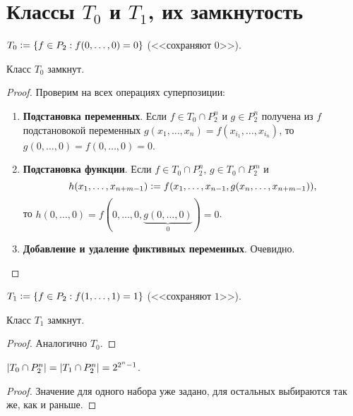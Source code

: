 \section{Классы $T_0$ и $T_1$, их замкнутость}

\begin{definition}
    $T_0 \vcentcolon = \{f \in P_2: f(0, \ldots, 0) = 0\}$ (<<сохраняют $0$>>).
\end{definition}

\begin{proposal}
    Класс $T_0$ замкнут.
\end{proposal}

\begin{proof}
    Проверим на всех операциях суперпозиции:
    \begin{enumerate}
        \item \textbf{Подстановка переменных}. Если $f \in T_0 \cap P_2^n$ и $g \in P_2^n$ получена из $f$ подстановокой переменных $g(x_1, \ldots, x_n) = f(x_{i_1}, \ldots, x_{i_n})$, то $g(0, \ldots, 0) = f(0, \ldots, 0) = 0$.
        \item \textbf{Подстановка функции}. Если $f \in T_0 \cap P_2^n$, $g \in T_0 \cap P_2^m$ и
            \[
                h(x_1, \ldots, x_{n + m - 1}) \vcentcolon = f(x_1, \ldots, x_{n - 1}, g(x_n, \ldots, x_{n + m - 1})),
            \]
            то $h(0, \ldots, 0) = f(0, \ldots, 0, \underbrace{g(0, \ldots, 0)}_{0}) = 0$.
        \item \textbf{Добавление и удаление фиктивных переменных}. Очевидно.
    \end{enumerate}
\end{proof}

\begin{definition}
    $T_1 \vcentcolon = \{f \in P_2: f(1, \ldots, 1) = 1\}$ (<<сохраняют $1$>>).
\end{definition}

\begin{proposal}
    Класс $T_1$ замкнут.
\end{proposal}

\begin{proof}
    Аналогично $T_0$.
\end{proof}

\begin{proposal}
    $\left\lvert T_0 \cap P_2^n\right\rvert = \left\lvert T_1 \cap P_2^n\right\rvert = 2^{2^n - 1}$.
\end{proposal}

\begin{proof}
    Значение для одного набора уже задано, для остальных выбираются так же, как и раньше.
\end{proof}

